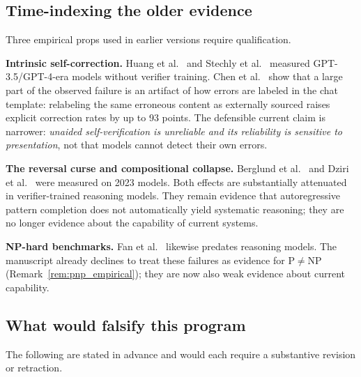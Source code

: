 \documentclass[11pt,a4paper]{article}
\begin{document}
\subsection{Time-indexing the older evidence}
\label{sec:timeindex}

Three empirical props used in earlier versions require qualification.

\textbf{Intrinsic self-correction.} Huang et al.~\cite{huang2023selfcorrect} and Stechly et al.~\cite{stechly2024verification} measured GPT-3.5/GPT-4-era models without verifier training. Chen et al.~\cite{chen2026selfcorrection} show that a large part of the observed failure is an artifact of how errors are labeled in the chat template: relabeling the same erroneous content as externally sourced raises explicit correction rates by up to 93 points. The defensible current claim is narrower: \emph{unaided self-verification is unreliable and its reliability is sensitive to presentation}, not that models cannot detect their own errors.

\textbf{The reversal curse and compositional collapse.} Berglund et al.~\cite{berglund2023reversal} and Dziri et al.~\cite{dziri2023faith} were measured on 2023 models. Both effects are substantially attenuated in verifier-trained reasoning models. They remain evidence that autoregressive pattern completion does not automatically yield systematic reasoning; they are no longer evidence about the capability of current systems.

\textbf{NP-hard benchmarks.} Fan et al.~\cite{fan2023nphardeval} likewise predates reasoning models. The manuscript already declines to treat these failures as evidence for $\mathrm{P} \neq \mathrm{NP}$ (Remark~\ref{rem:pnp_empirical}); they are now also weak evidence about current capability.

\subsection{What would falsify this program}
\label{sec:falsification}

The following are stated in advance and would each require a substantive revision or retraction.
\end{document}
